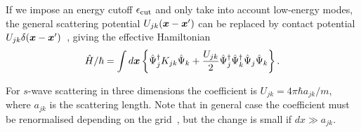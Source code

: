 If we impose an energy cutoff $\epsilon_{\mathrm{cut}}$ and only take into account low-energy modes,
the general scattering potential $U_{jk}(\boldsymbol{x} - \boldsymbol{x}^\prime)$ can be replaced by contact potential $U_{jk} \delta(\boldsymbol{x} - \boldsymbol{x}^\prime)$~\cite{Morgan2000}, giving the effective Hamiltonian
\begin{equation}
\label{eqn:wigner-bec:hamiltonian:effective-H}
\begin{split}
	\hat{H} / \hbar = \int d\boldsymbol{x} \left\{
		\hat{\Psi}_j^{\dagger} K_{jk} \hat{\Psi}_k
		+ \frac{U_{jk}}{2} \hat{\Psi}_j^\dagger \hat{\Psi}_k^\dagger \hat{\Psi}_j \hat{\Psi}_k
	\right\}.
\end{split}
\end{equation}

For $s$-wave scattering in three dimensions the coefficient is $U_{jk} = 4 \pi \hbar a_{jk} / m$,
where $a_{jk}$ is the scattering length.
Note that in general case the coefficient must be renormalised depending on the grid~\cite{Sinatra2002},
but the change is small if $dx \gg a_{jk}$.
